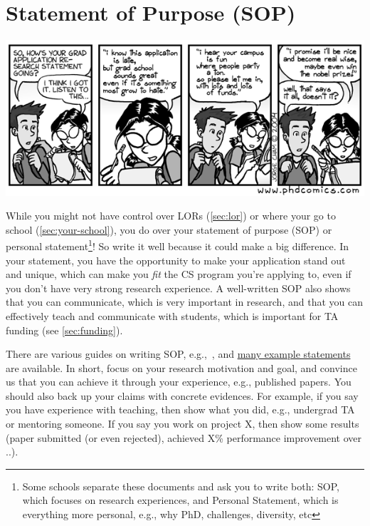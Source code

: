 \documentclass[oneside,11pt]{book}
\begin{document}
\section{Statement of Purpose (SOP)}\label{sec:research-statement}

\begin{center}
  \includegraphics[scale=0.4]{files/c2.png}
\end{center}

While you might not have control over LORs (\autoref{sec:lor}) or where your go to school (\autoref{sec:your-school}), you do over your
statement of purpose (SOP) or personal statement\footnote{Some schools separate these documents and ask you to write both: SOP, which focuses on research experiences, and Personal Statement, which is everything more personal, e.g., why PhD, challenges, diversity, etc}! So write it well because it could make a big difference.
In your statement, you have the opportunity to make your application stand out and unique, which can make you \emph{fit} the CS program you're applying to, even if you don't have very strong research experience.
A well-written SOP also shows that you can communicate, which is very important in research, and that you can effectively teach and communicate with students, which is important for TA funding (see \autoref{sec:funding}).

There are various guides on writing SOP, e.g.,~\cite{blattman2022writing}, and \href{https://cs-sop.org/}{many example statements} are available. In short, focus on your research motivation and goal, and convince us that you can achieve it through your experience, e.g., published papers. You should also back up your claims with concrete evidences. For example, if you say you have experience with teaching, then show what you did, e.g., undergrad TA or mentoring someone.  If you say you work on project X, then show some results (paper submitted (or even rejected), achieved X\% performance improvement over ..). 
\end{document}
